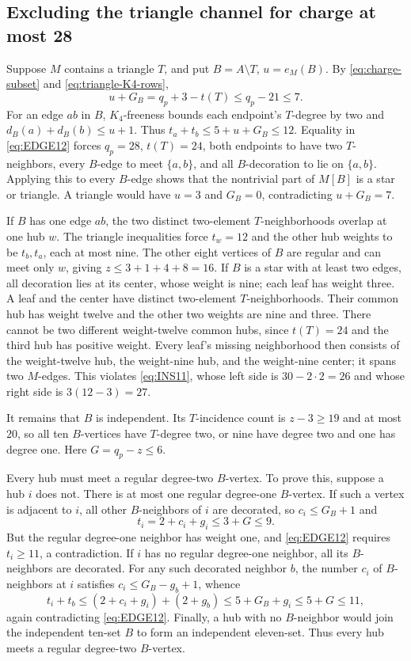 \subsection{Excluding the triangle channel for charge at most 28}

Suppose $M$ contains a triangle $T$, and put $B=A\setminus T$, $u=e_M(B)$. By \cref{eq:charge-subset} and \cref{eq:triangle-K4-rows},
\[
u+G_B=q_p+3-t(T)\leq q_p-21\leq7.
\]
For an edge $ab$ in $B$, $K_4$-freeness bounds each endpoint's $T$-degree by two and $d_B(a)+d_B(b)\leq u+1$. Thus $t_a+t_b\leq5+u+G_B\leq12$. Equality in \cref{eq:EDGE12} forces $q_p=28$, $t(T)=24$, both endpoints to have two $T$-neighbors, every $B$-edge to meet $\{a,b\}$, and all $B$-decoration to lie on $\{a,b\}$. Applying this to every $B$-edge shows that the nontrivial part of $M[B]$ is a star or triangle. A triangle would have $u=3$ and $G_B=0$, contradicting $u+G_B=7$.

If $B$ has one edge $ab$, the two distinct two-element $T$-neighborhoods overlap at one hub $w$. The triangle inequalities force $t_w=12$ and the other hub weights to be $t_b,t_a$, each at most nine. The other eight vertices of $B$ are regular and can meet only $w$, giving $z\leq3+1+4+8=16$. If $B$ is a star with at least two edges, all decoration lies at its center, whose weight is nine; each leaf has weight three. A leaf and the center have distinct two-element $T$-neighborhoods. Their common hub has weight twelve and the other two weights are nine and three. There cannot be two different weight-twelve common hubs, since $t(T)=24$ and the third hub has positive weight. Every leaf's missing neighborhood then consists of the weight-twelve hub, the weight-nine hub, and the weight-nine center; it spans two $M$-edges. This violates \cref{eq:INS11}, whose left side is $30-2\cdot2=26$ and whose right side is $3(12-3)=27$.

It remains that $B$ is independent. Its $T$-incidence count is $z-3\geq19$ and at most $20$, so all ten $B$-vertices have $T$-degree two, or nine have degree two and one has degree one. Here $G=q_p-z\leq6$.

Every hub must meet a regular degree-two $B$-vertex. To prove this, suppose a hub $i$ does not. There is at most one regular degree-one $B$-vertex. If such a vertex is adjacent to $i$, all other $B$-neighbors of $i$ are decorated, so $c_i\leq G_B+1$ and
\[
t_i=2+c_i+g_i\leq3+G\leq9.
\]
But the regular degree-one neighbor has weight one, and \cref{eq:EDGE12} requires $t_i\geq11$, a contradiction. If $i$ has no regular degree-one neighbor, all its $B$-neighbors are decorated. For any such decorated neighbor $b$, the number $c_i$ of $B$-neighbors at $i$ satisfies $c_i\leq G_B-g_b+1$, whence
\[
t_i+t_b\leq(2+c_i+g_i)+(2+g_b)
\leq5+G_B+g_i\leq5+G\leq11,
\]
again contradicting \cref{eq:EDGE12}. Finally, a hub with no $B$-neighbor would join the independent ten-set $B$ to form an independent eleven-set. Thus every hub meets a regular degree-two $B$-vertex.

